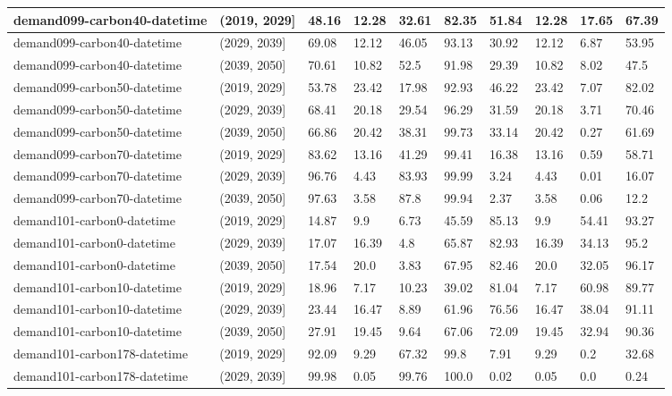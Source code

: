\begin{table}[h]
\begin{tabular}{|l|l|l|l|l|l|l|l|l|l|}
		demand099-carbon40-datetime & (2019, 2029] & 48.16 & 12.28 & 32.61 & 82.35 & 51.84 & 12.28 & 17.65 & 67.39 \\ \hline
		demand099-carbon40-datetime & (2029, 2039] & 69.08 & 12.12 & 46.05 & 93.13 & 30.92 & 12.12 & 6.87 & 53.95 \\ \hline
		demand099-carbon40-datetime & (2039, 2050] & 70.61 & 10.82 & 52.5 & 91.98 & 29.39 & 10.82 & 8.02 & 47.5 \\ \hline
		demand099-carbon50-datetime & (2019, 2029] & 53.78 & 23.42 & 17.98 & 92.93 & 46.22 & 23.42 & 7.07 & 82.02 \\ \hline
		demand099-carbon50-datetime & (2029, 2039] & 68.41 & 20.18 & 29.54 & 96.29 & 31.59 & 20.18 & 3.71 & 70.46 \\ \hline
		demand099-carbon50-datetime & (2039, 2050] & 66.86 & 20.42 & 38.31 & 99.73 & 33.14 & 20.42 & 0.27 & 61.69 \\ \hline
		demand099-carbon70-datetime & (2019, 2029] & 83.62 & 13.16 & 41.29 & 99.41 & 16.38 & 13.16 & 0.59 & 58.71 \\ \hline
		demand099-carbon70-datetime & (2029, 2039] & 96.76 & 4.43 & 83.93 & 99.99 & 3.24 & 4.43 & 0.01 & 16.07 \\ \hline
		demand099-carbon70-datetime & (2039, 2050] & 97.63 & 3.58 & 87.8 & 99.94 & 2.37 & 3.58 & 0.06 & 12.2 \\ \hline
		demand101-carbon0-datetime & (2019, 2029] & 14.87 & 9.9 & 6.73 & 45.59 & 85.13 & 9.9 & 54.41 & 93.27 \\ \hline
		demand101-carbon0-datetime & (2029, 2039] & 17.07 & 16.39 & 4.8 & 65.87 & 82.93 & 16.39 & 34.13 & 95.2 \\ \hline
		demand101-carbon0-datetime & (2039, 2050] & 17.54 & 20.0 & 3.83 & 67.95 & 82.46 & 20.0 & 32.05 & 96.17 \\ \hline
		demand101-carbon10-datetime & (2019, 2029] & 18.96 & 7.17 & 10.23 & 39.02 & 81.04 & 7.17 & 60.98 & 89.77 \\ \hline
		demand101-carbon10-datetime & (2029, 2039] & 23.44 & 16.47 & 8.89 & 61.96 & 76.56 & 16.47 & 38.04 & 91.11 \\ \hline
		demand101-carbon10-datetime & (2039, 2050] & 27.91 & 19.45 & 9.64 & 67.06 & 72.09 & 19.45 & 32.94 & 90.36 \\ \hline
		demand101-carbon178-datetime & (2019, 2029] & 92.09 & 9.29 & 67.32 & 99.8 & 7.91 & 9.29 & 0.2 & 32.68 \\ \hline
		demand101-carbon178-datetime & (2029, 2039] & 99.98 & 0.05 & 99.76 & 100.0 & 0.02 & 0.05 & 0.0 & 0.24 \\ \hline

\end{tabular}
\end{table}
